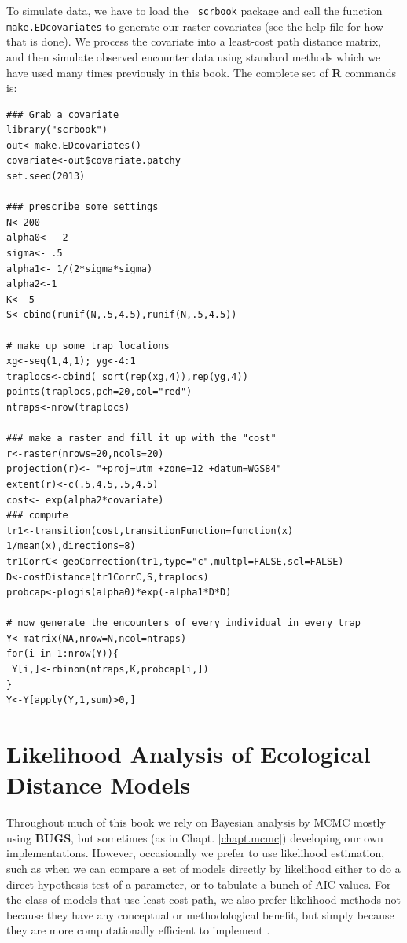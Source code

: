 To simulate data, 
 we have to load the \mbox{\tt
scrbook} package and call the function \mbox{\tt make.EDcovariates} to generate
our raster covariates (see the help file for how that is done). We
process the covariate into a least-cost path distance
matrix, and then simulate observed encounter data using standard methods
which we have used many times previously in this book. The complete set
of {\bf R} commands is:
{\small
\begin{verbatim}
### Grab a covariate
library("scrbook")
out<-make.EDcovariates()
covariate<-out$covariate.patchy
set.seed(2013)

### prescribe some settings
N<-200
alpha0<- -2
sigma<- .5
alpha1<- 1/(2*sigma*sigma)
alpha2<-1
K<- 5
S<-cbind(runif(N,.5,4.5),runif(N,.5,4.5))

# make up some trap locations
xg<-seq(1,4,1); yg<-4:1
traplocs<-cbind( sort(rep(xg,4)),rep(yg,4))
points(traplocs,pch=20,col="red")
ntraps<-nrow(traplocs)

### make a raster and fill it up with the "cost"
r<-raster(nrows=20,ncols=20)
projection(r)<- "+proj=utm +zone=12 +datum=WGS84"
extent(r)<-c(.5,4.5,.5,4.5)
cost<- exp(alpha2*covariate)
### compute 
tr1<-transition(cost,transitionFunction=function(x) 1/mean(x),directions=8)
tr1CorrC<-geoCorrection(tr1,type="c",multpl=FALSE,scl=FALSE)
D<-costDistance(tr1CorrC,S,traplocs)
probcap<-plogis(alpha0)*exp(-alpha1*D*D)

# now generate the encounters of every individual in every trap
Y<-matrix(NA,nrow=N,ncol=ntraps)
for(i in 1:nrow(Y)){
 Y[i,]<-rbinom(ntraps,K,probcap[i,])
}
Y<-Y[apply(Y,1,sum)>0,]
\end{verbatim}
}










\section{Likelihood Analysis of Ecological Distance Models}
\label{ecoldist.sec.mle}

Throughout much of this book we rely on Bayesian analysis by MCMC
mostly using {\bf BUGS}, but sometimes (as in Chapt. \ref{chapt.mcmc})
developing our own implementations. However, occasionally we prefer to
use likelihood estimation, such as when we can compare a set of models
directly by likelihood either to do a direct hypothesis test of a
parameter, or to tabulate a bunch of AIC values. For
the class of models that use least-cost path, we also 
prefer likelihood methods not because they have any
conceptual or methodological benefit, but simply because they are more
computationally efficient to implement \citep{royle_etal:2012ecol}.

